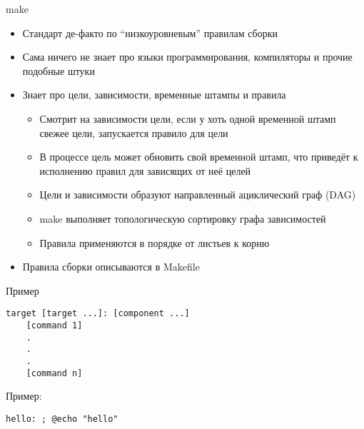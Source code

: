 \documentclass{../../slides-style}
\begin{document}
    \begin{frame}{make}
        \begin{itemize}
            \item Стандарт де-факто по \enquote{низкоуровневым} правилам сборки
            \item Сама ничего не знает про языки программирования, компиляторы и прочие подобные штуки
            \item Знает про цели, зависимости, временные штампы и правила
            \begin{itemize}
                \item Смотрит на зависимости цели, если у хоть одной временной штамп свежее цели, запускается правило для цели
                \item В процессе цель может обновить свой временной штамп, что приведёт к исполнению правил для зависящих от неё целей
                \item Цели и зависимости образуют направленный ациклический граф (DAG)
                \item make выполняет топологическую сортировку графа зависимостей
                \item Правила применяются в порядке от листьев к корню
            \end{itemize}
            \item Правила сборки описываются в Makefile
        \end{itemize}
    \end{frame}

    \begin{frame}[fragile]{Пример}
        \begin{footnotesize}
            \begin{verbatim}
target [target ...]: [component ...]
    [command 1]
    .
    .
    .
    [command n]
            \end{verbatim}
        \end{footnotesize}
        Пример:
        \begin{footnotesize}
            \begin{verbatim}
hello: ; @echo "hello"
            \end{verbatim}
        \end{footnotesize}
    \end{frame}
\end{document}
